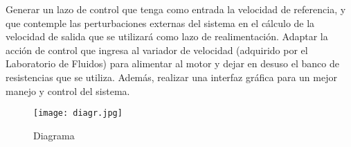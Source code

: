 Generar un lazo de control que tenga como entrada la velocidad de referencia, y que contemple las perturbaciones externas del sistema en el cálculo de la velocidad de salida que se utilizará como lazo de realimentación. 
Adaptar la acción de control que ingresa al variador de velocidad (adquirido por el Laboratorio de Fluidos) para alimentar al motor y dejar en desuso el banco de resistencias que se utiliza.
Además, realizar una interfaz gráfica para un mejor manejo y control del sistema.

\begin{figure}[htb]
	\centering
	\texttt{[image: diagr.jpg]}
	\caption{Diagrama}
	\label{fig:diagr}
	\end{figure}